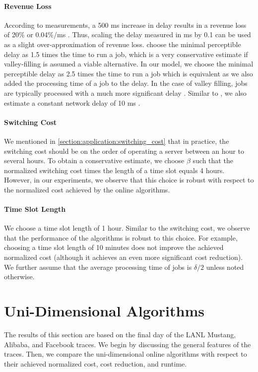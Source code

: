 \paragraph{Revenue Loss} According to measurements, a 500 ms increase in delay results in a revenue loss of 20\% or 0.04\%/ms \cite{Lin2012, Hamilton2009}. Thus, scaling the delay measured in ms by 0.1 can be used as a slight over-approximation of revenue loss. \citeauthor*{Lin2011} choose the minimal perceptible delay as 1.5 times the time to run a job, which is a very conservative estimate if valley-filling is assumed a viable alternative. In our model, we choose the minimal perceptible delay as 2.5 times the time to run a job which is equivalent as we also added the processing time of a job to the delay. In the case of valley filling, jobs are typically processed with a much more significant delay \cite{Lin2011}. Similar to \citeauthor*{Lin2012}, we also estimate a constant network delay of 10 ms \cite{Lin2012}.

\paragraph{Switching Cost} We mentioned in \autoref{section:application:switching_cost} that in practice, the switching cost should be on the order of operating a server between an hour to several hours. To obtain a conservative estimate, we choose $\beta$ such that the normalized switching cost times the length of a time slot equals 4 hours. However, in our experiments, we observe that this choice is robust with respect to the normalized cost achieved by the online algorithms.

\paragraph{Time Slot Length} We choose a time slot length of 1 hour. Similar to the switching cost, we observe that the performance of the algorithms is robust to this choice. For example, choosing a time slot length of 10 minutes does not improve the achieved normalized cost (although it achieves an even more significant cost reduction). We further assume that the average processing time of jobs is $\delta / 2$ unless noted otherwise.

\section{Uni-Dimensional Algorithms}

The results of this section are based on the final day of the LANL Mustang, Alibaba, and Facebook traces. We begin by discussing the general features of the traces. Then, we compare the uni-dimensional online algorithms with respect to their achieved normalized cost, cost reduction, and runtime.


